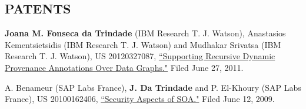 \documentclass[line,margin]{res}
\begin{document}
\begin{resume}

\section{PATENTS}  \textbf{Joana M. Fonseca da Trindade} (IBM Research T. J. Watson), Anastasios Kementsietsidis (IBM Research T. J. Watson) and Mudhakar Srivatsa (IBM Research T. J. Watson), US 20120327087, \href{http://www.faqs.org/patents/app/20120327087}{``Supporting Recursive Dynamic Provenance Annotations Over Data Graphs."} Filed June 27, 2011.

A. Benameur (SAP Labs France), \textbf{J. Da Trindade} and P. El-Khoury (SAP Labs France), US 20100162406, \href{http://www.faqs.org/patents/app/20100162406}{``Security Aspects of SOA."}  Filed June 12, 2009.


\end{resume}
\end{document}
